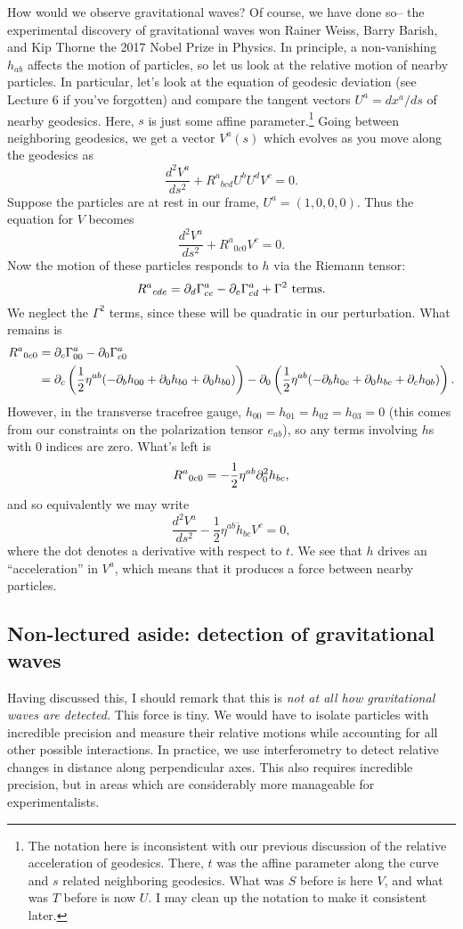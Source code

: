 How would we observe gravitational waves? Of course, we have done so-- the experimental discovery of gravitational waves won Rainer Weiss, Barry Barish, and Kip Thorne the 2017 Nobel Prize in Physics. In principle, a non-vanishing $h_{ab}$ affects the motion of particles, so let us look at the relative motion of nearby particles. In particular, let's look at the equation of geodesic deviation (see Lecture 6 if you've forgotten) and compare the tangent vectors $U^a=dx^a/ds$ of nearby geodesics. Here, $s$ is just some affine parameter.\footnote{The notation here is inconsistent with our previous discussion of the relative acceleration of geodesics. There, $t$ was the affine parameter along the curve and $s$ related neighboring geodesics. What was $S$ before is here $V$, and what was $T$ before is now $U$. I may clean up the notation to make it consistent later.} Going between neighboring geodesics, we get a vector $V^a(s)$ which evolves as you move along the geodesics as
$$\frac{d^2 V^a}{ds^2}+{R^a}_{bcd}U^b U^d V^c =0.$$
Suppose the particles are at rest in our frame, $U^a=(1,0,0,0).$ Thus the equation for $V$ becomes
$$\frac{d^2V^a}{ds^2}+{R^a}_{0c0}V^c =0.$$
Now the motion of these particles responds to $h$ via the Riemann tensor:
$${R^a}_{cde}=\partial_d \Gamma^a_{ce}-\partial_e \Gamma^a_{cd}+\Gamma^2\text{ terms}.$$
We neglect the $\Gamma^2$ terms, since these will be quadratic in our perturbation. What remains is
\begin{align*}
    {R^a}_{0c0}&= \partial_c \Gamma^a_{00}-\partial_0 \Gamma^a_{c0}\\
    &= \partial_c \left(\frac{1}{2}\eta^{ab}(-\partial_b h_{00}+\partial_0 h_{b0}+\partial_0 h_{b0})\right)-\partial_0\left(\frac{1}{2}\eta^{ab}(-\partial_b h_{0c}+\partial_0 h_{bc}+\partial_c h_{0b})\right).
\end{align*}
However, in the transverse tracefree gauge, $h_{00}=h_{01}=h_{02}=h_{03}=0$ (this comes from our constraints on the polarization tensor $e_{ab}$), so any terms involving $h$s with $0$ indices are zero. What's left is
$${R^a}_{0c0}=-\frac{1}{2}\eta^{ab}\partial_0^2 h_{bc},$$
and so equivalently we may write
$$\frac{d^2V^a}{ds^2}-\frac{1}{2}\eta^{ab} \ddot h_{bc} V^c=0,$$
where the dot denotes a derivative with respect to $t$.
We see that $h$ drives an ``acceleration'' in $V^a$, which means that it produces a force between nearby particles.

\subsection*{Non-lectured aside: detection of gravitational waves}
Having discussed this, I should remark that this is \emph{not at all how gravitational waves are detected.} This force is tiny. We would have to isolate particles with incredible precision and measure their relative motions while accounting for all other possible interactions. In practice, we use interferometry to detect relative changes in distance along perpendicular axes. This also requires incredible precision, but in areas which are considerably more manageable for experimentalists. 

